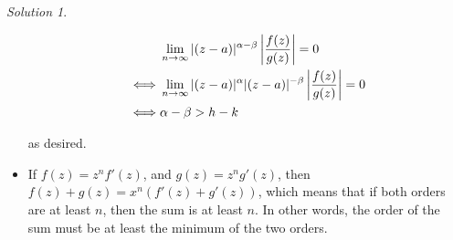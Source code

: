 \documentclass[notitlepage]{article}
\theoremstyle{definition}
\theoremstyle{remark}
\newtheorem*{sol}{Solution}
\begin{document}
\begin{sol}
\begin{itemize}
		\begin{align*}
		& \lim_{n \to \infty} |(z-a)|^{\alpha-\beta} \left|{f(z) \over g(z)}\right| = 0 \\
		\iff & \lim_{n \to \infty} |(z-a)|^{\alpha} |(z-a)|^{-\beta} \left|{f(z) \over g(z)}\right| = 0\\
		\iff & \alpha - \beta > h - k \\
		\end{align*}
		
		as desired.
		\item 
		If $f(z) = z^n f'(z)$, and $g(z) = z^n g'(z)$, then $f(z)+g(z) = x^n (f'(z)+g'(z))$, which means that if both orders are at least $n$, then the sum is at least $n$.  In other words, the order of the sum must be at least the minimum of the two orders.
		
	\end{itemize}
\end{sol}
\end{document}
